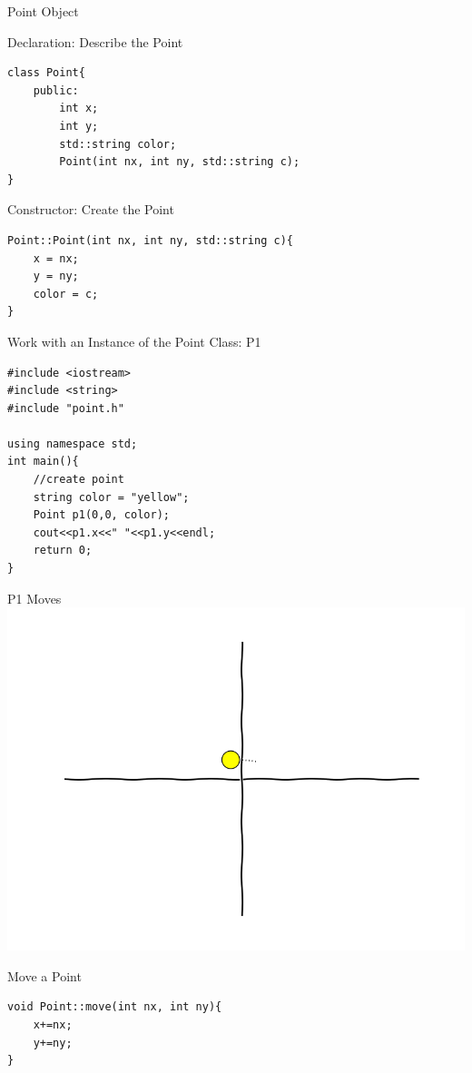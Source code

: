 \documentclass[xcolor={dvipsnames}]{beamer}
\begin{document}
\begin{frame}[fragile]{Point Object}
\begin{block}{Declaration: Describe the Point}
\begin{verbatim}
class Point{
    public:
        int x;
        int y;
        std::string color;
        Point(int nx, int ny, std::string c);
}
\end{verbatim}
\end{block}
\pause
\begin{block}{Constructor: Create the Point}
\begin{verbatim}
Point::Point(int nx, int ny, std::string c){
    x = nx;
    y = ny;
    color = c;
}
\end{verbatim}
\end{block}
\end{frame}

\begin{frame}[fragile]{Work with an Instance of the Point Class: P1}
\begin{verbatim}
#include <iostream>
#include <string>
#include "point.h"

using namespace std;
int main(){
    //create point
    string color = "yellow";
    Point p1(0,0, color);
    cout<<p1.x<<" "<<p1.y<<endl;
    return 0;
}
\end{verbatim}
\end{frame}

\begin{frame}{P1 Moves}
	\includegraphics[width=1\textwidth]{traj001}
\end{frame}

\begin{frame}[fragile]{Move a Point}
\begin{verbatim}
void Point::move(int nx, int ny){
    x+=nx;
    y+=ny;
}
\end{verbatim}
\end{frame}
\end{document}

